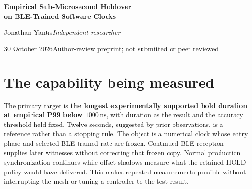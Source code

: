 \documentclass[11pt,letterpaper]{article}
\newcommand{\ns}{\,\mathrm{ns}}\newcommand{\us}{\,\mu\mathrm{s}}
\begin{document}
\begin{center}
{\LARGE\bfseries Empirical Sub-Microsecond Holdover\\[3pt] on BLE-Trained Software Clocks}\par
\vspace{5pt}{\large MCXO-inspired measurement on W12}\par
\vspace{7pt}Jonathan Yantis\quad\textit{Independent researcher}\par
30 October 2026\quad Author-review preprint; not submitted or peer reviewed
\end{center}
\vspace{-8pt}
\begin{abstract}\noindent
How long can a small BLE-trained clock retain sampled error below one microsecond at P99? \AbstractResult{} \AbstractDuration{}
We freeze offset clock copies and take each run's maximum absolute error over its entire sampled prefix through the first actual BLE witness at or after each tested age. Each age requires at least 100 scored runs and retains 128 outcomes independently. Production HOLD uses a causal BLE rate selector; temperature compensation remains a separate shadow. The complete windows preserve crossings, unknown expiry, gaps and censored runs, with public numeric observations and offline replay. The overlapping runs are correlated. These finite measurements describe agreement with received BLE time, not a continuous gap-interior bound or independently calibrated UTC/electrical output.
\end{abstract}
\vspace{-5pt}
\section{The capability being measured}
The primary target is \textbf{the longest experimentally supported hold duration at empirical P99 below $1000\ns$}, with duration as the result and the accuracy threshold held fixed. Twelve seconds, suggested by prior observations, is a reference rather than a stopping rule. The object is a numerical clock whose entry phase and selected BLE-trained rate are frozen. Continued BLE reception supplies later witnesses without correcting that frozen copy. Normal production synchronization continues while offset shadows measure what the retained HOLD policy would have delivered. This makes repeated measurements possible without interrupting the mesh or tuning a controller to the test result.
\end{document}
